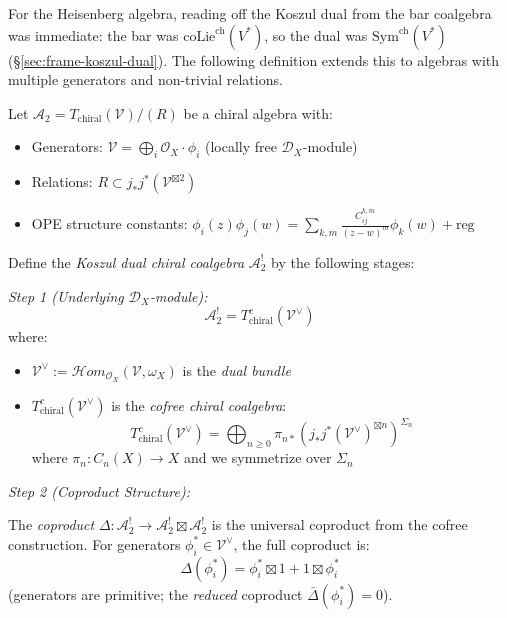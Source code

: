 \begin{definition}\label{def:koszul-dual-coalgebra}
\label{def:intrinsic-koszul-dual}
\label{def:koszul-dual-chiral}
For the Heisenberg algebra, reading off the Koszul dual from the bar coalgebra was immediate: the bar was $\mathrm{coLie}^{\mathrm{ch}}(V^*)$, so the dual was $\mathrm{Sym}^{\mathrm{ch}}(V^*)$ (\S\ref{sec:frame-koszul-dual}).  The following definition extends this to algebras with multiple generators and non-trivial relations.

Let $\mathcal{A}_2 = T_{\text{chiral}}(\mathcal{V})/(R)$ be a chiral algebra with:
\begin{itemize}
\item Generators: $\mathcal{V} = \bigoplus_{i} \mathcal{O}_X \cdot \phi_i$ (locally free $\mathcal{D}_X$-module)
\item Relations: $R \subset j_*j^*(\mathcal{V}^{\boxtimes 2})$ 
\item OPE structure constants: $\phi_i(z)\phi_j(w) = \sum_{k,m} \frac{C_{ij}^{k,m}}{(z-w)^m} \phi_k(w) + \text{reg}$
\end{itemize}

Define the \emph{Koszul dual chiral coalgebra} $\mathcal{A}_2^!$ by the following stages:

\medskip
\noindent\emph{Step 1 (Underlying $\mathcal{D}_X$-module):}
\[\mathcal{A}_2^! = T^c_{\text{chiral}}(\mathcal{V}^{\vee})\]
where:
\begin{itemize}
\item $\mathcal{V}^{\vee} := \mathcal{H}om_{\mathcal{O}_X}(\mathcal{V}, \omega_X)$ is the \emph{dual bundle}
\item $T^c_{\text{chiral}}(\mathcal{V}^{\vee})$ is the \emph{cofree chiral coalgebra}:
\[T^c_{\text{chiral}}(\mathcal{V}^{\vee}) = \bigoplus_{n \geq 0} \pi_{n*}\left(j_*j^*(\mathcal{V}^{\vee})^{\boxtimes n}\right)^{\Sigma_n}\]
where $\pi_n: C_n(X) \to X$ and we symmetrize over $\Sigma_n$
\end{itemize}

\medskip
\noindent\emph{Step 2 (Coproduct Structure):}

The \emph{coproduct} $\Delta: \mathcal{A}_2^! \to \mathcal{A}_2^! \boxtimes \mathcal{A}_2^!$ is the universal coproduct from the cofree construction. For generators $\phi_i^* \in \mathcal{V}^{\vee}$, the full coproduct is:
\[\Delta(\phi_i^*) = \phi_i^* \boxtimes 1 + 1 \boxtimes \phi_i^*\]
(generators are primitive; the \emph{reduced} coproduct $\bar{\Delta}(\phi_i^*) = 0$).


\end{definition}
